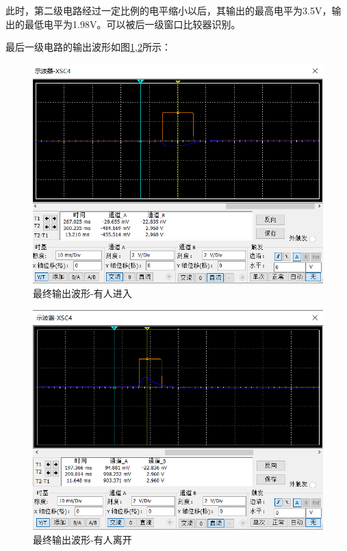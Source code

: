 \documentclass{article}
\begin{document}
\begin{spacing}{1.5}
    
    此时，第二级电路经过一定比例的电平缩小以后，其输出的最高电平为3.5V，输出的最低电平为1.98V。可以被后一级窗口比较器识别。

    最后一级电路的输出波形如图\ref{fig:sim4_result11},\ref{fig:sim4_result10}所示：
  
    \begin{figure}[H]
        \centering
        \includegraphics[scale=0.4]{fig/sim/sim4_result11.png}
        \caption{最终输出波形-有人进入}
        \label{fig:sim4_result11}
    \end{figure}
    
        \begin{figure}[H]
        \centering
        \includegraphics[scale=0.4]{fig/sim/sim4_result10.png}
        \caption{最终输出波形-有人离开}
        \label{fig:sim4_result10}
    \end{figure}


\end{spacing}
\end{document}
